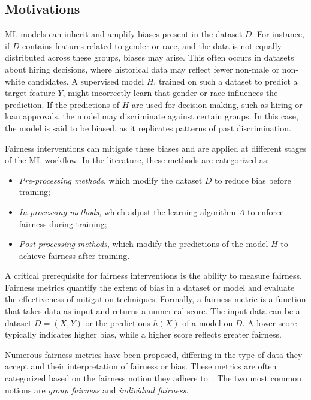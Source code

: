 \subsection{Motivations}\label{subsec:fairness-motivations}
%
\Gls{ML} models can inherit and amplify biases present in the dataset \(D\).
%
For instance, if \(D\) contains features related to gender or race, and the data is not equally distributed across these groups, biases may arise.
%
This often occurs in datasets about hiring decisions, where historical data may reflect fewer non-male or non-white candidates.
%
A supervised model \(H\), trained on such a dataset to predict a target feature \(Y\), might incorrectly learn that gender or race influences the prediction.
%
If the predictions of \(H\) are used for decision-making, such as hiring or loan approvals, the model may discriminate against certain groups.
%
In this case, the model is said to be biased, as it replicates patterns of past discrimination.

%
Fairness interventions can mitigate these biases and are applied at different stages of the \gls{ML} workflow.
%
In the literature, these methods are categorized as:
%
\begin{itemize}
    \item \textit{Pre-processing methods}, which modify the dataset \(D\) to reduce bias before training;
    \item \textit{In-processing methods}, which adjust the learning algorithm \(A\) to enforce fairness during training;
    \item \textit{Post-processing methods}, which modify the predictions of the model \(H\) to achieve fairness after training.
\end{itemize}

%
A critical prerequisite for fairness interventions is the ability to measure fairness.
%
Fairness metrics quantify the extent of bias in a dataset or model and evaluate the effectiveness of mitigation techniques.
%
Formally, a fairness metric is a function that takes data as input and returns a numerical score.
%
The input data can be a dataset \(D = (X, Y)\) or the predictions \(h(X)\) of a model on \(D\).
%
A lower score typically indicates higher bias, while a higher score reflects greater fairness.

%
Numerous fairness metrics have been proposed, differing in the type of data they accept and their interpretation of fairness or bias.
%
These metrics are often categorized based on the fairness notion they adhere to~\cite{DBLP:journals/csur/MehrabiMSLG21}.
%
The two most common notions are \textit{group fairness} and \textit{individual fairness}.


